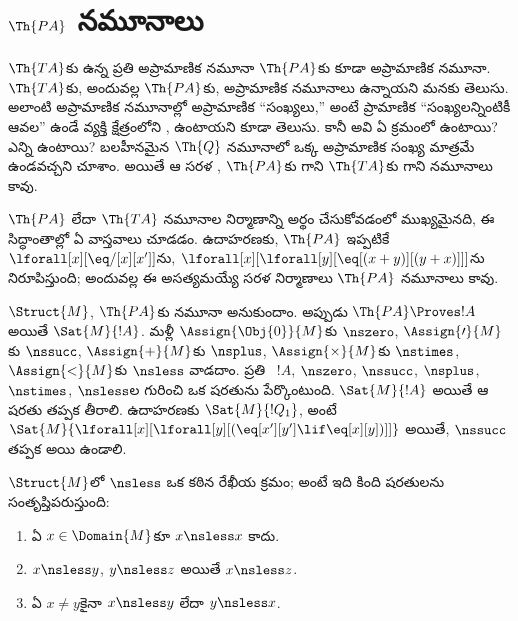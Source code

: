 \documentclass[../../../include/open-logic-section]{subfiles}
\begin{document}
\section{$\Th{PA}$ నమూనాలు}

\begin{explain}
$\Th{TA}$కు ఉన్న ప్రతి అప్రామాణిక నమూనా $\Th{PA}$కు కూడా అప్రామాణిక
నమూనా. $\Th{TA}$కు, అందువల్ల $\Th{PA}$కు, అప్రామాణిక నమూనాలు
ఉన్నాయని మనకు తెలుసు. అలాంటి అప్రామాణిక నమూనాల్లో అప్రామాణిక
“సంఖ్యలు,” అంటే ప్రామాణిక “సంఖ్యలన్నింటికీ ఆవల” ఉండే వ్యక్తి
క్షేత్రంలోని , ఉంటాయని కూడా తెలుసు.
కానీ అవి ఏ క్రమంలో ఉంటాయి? ఎన్ని ఉంటాయి? బలహీనమైన
$\Th{Q}$ నమూనాలో ఒక్క అప్రామాణిక సంఖ్య మాత్రమే ఉండవచ్చని చూశాం.
అయితే ఆ సరళ , $\Th{PA}$కు గాని
$\Th{TA}$కు గాని నమూనాలు కావు.

$\Th{PA}$ లేదా $\Th{TA}$ నమూనాల నిర్మాణాన్ని అర్థం చేసుకోవడంలో
ముఖ్యమైనది, ఈ సిద్ధాంతాల్లో ఏ వాస్తవాలు
 చూడడం. ఉదాహరణకు,
$\Th{PA}$ ఇప్పటికే $\lforall[x][\eq/[x][x']]$ను,
$\lforall[x][\lforall[y][\eq[(x+y)][(y+x)]]]$ను నిరూపిస్తుంది;
అందువల్ల ఈ  అసత్యమయ్యే సరళ
నిర్మాణాలు $\Th{PA}$ నమూనాలు కావు.

$\Struct{M}$, $\Th{PA}$కు నమూనా అనుకుందాం. అప్పుడు
$\Th{PA}\Proves !A$ అయితే $\Sat{M}{!A}$. మళ్లీ
$\Assign{\Obj{0}}{M}$కు $\nszero$, $\Assign{\prime}{M}$కు
$\nssucc$, $\Assign{+}{M}$కు $\nsplus$,
$\Assign{\times}{M}$కు $\nstimes$, $\Assign{<}{M}$కు
$\nsless$ వాడదాం. ప్రతి ~$!A$,
$\nszero$, $\nssucc$, $\nsplus$, $\nstimes$, $\nsless$ల గురించి
ఒక షరతును పేర్కొంటుంది. $\Sat{M}{!A}$ అయితే ఆ షరతు తప్పక తీరాలి.
ఉదాహరణకు $\Sat{M}{!Q_1}$, అంటే
$\Sat{M}{\lforall[x][\lforall[y][(\eq[x'][y']\lif\eq[x][y])]]}$
అయితే, $\nssucc$ తప్పక
 అయి ఉండాలి.
\end{explain}

\begin{prop}
$\Struct{M}$లో $\nsless$ ఒక కఠిన రేఖీయ క్రమం; అంటే ఇది కింది
షరతులను సంతృప్తిపరుస్తుంది:
\begin{enumerate}
\item ఏ $x\in\Domain{M}$కూ $x\nsless x$ కాదు.
\item $x\nsless y$, $y\nsless z$ అయితే $x\nsless z$.
\item ఏ $x\neq y$కైనా $x\nsless y$ లేదా $y\nsless x$.
\end{enumerate}
\end{prop}
\end{document}
